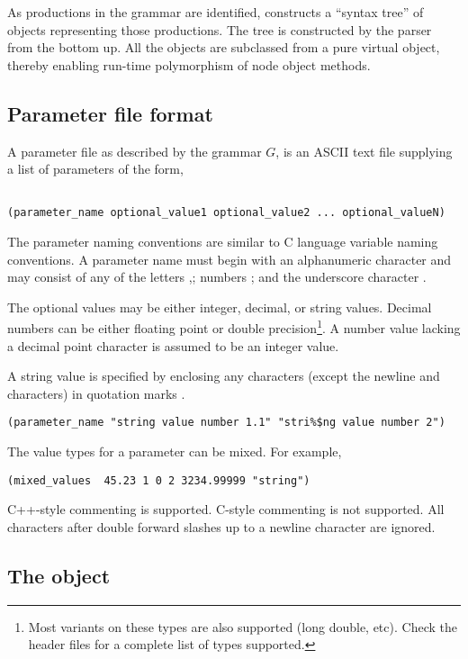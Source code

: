 \begin{appendix}
As productions in the grammar are identified,  constructs
a ``syntax tree'' of objects representing those productions. The tree is 
constructed by the parser from the bottom up.  All the objects are
subclassed from a pure virtual  object, thereby enabling
run-time polymorphism of node object methods.

\subsection{Parameter file format}
A parameter file as described by the grammar $G$, is an ASCII text file 
supplying a list of parameters of the form,
\begin{verbatim}

(parameter_name optional_value1 optional_value2 ... optional_valueN)

\end{verbatim}

The parameter naming conventions are similar to C language variable naming
conventions.  A parameter name must begin with an alphanumeric character and
may consist of any of the letters ,; numbers ; 
and the underscore character \code{\_}.

The optional values may be either integer, decimal, or string values.  Decimal
numbers can be either floating point or  double precision\footnote{Most variants
on these types are also supported (long double, etc).  Check the header files
for a complete list of types supported.}.  A number value lacking a decimal point 
character is assumed to be an integer value.

A string value is specified by enclosing any characters (except the newline and
 characters) in quotation marks .
\begin{verbatim}
(parameter_name "string value number 1.1" "stri%$ng value number 2")
\end{verbatim}

The value types for a parameter can be mixed.  For example,
\begin{verbatim}
(mixed_values  45.23 1 0 2 3234.99999 "string")
\end{verbatim}

C++-style commenting is supported.  C-style commenting is not supported.  All
characters after double forward slashes \code{//} up to a newline character are
ignored.

\subsection{The  object}

\end{appendix}
